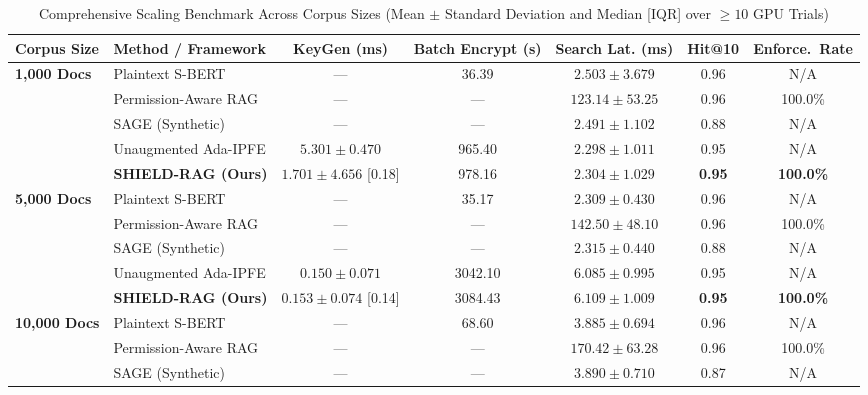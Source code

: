 \documentclass[10pt,a4paper]{article}
\begin{document}
\begin{table}[t]
\centering
\caption{Comprehensive Scaling Benchmark Across Corpus Sizes (Mean $\pm$ Standard Deviation and Median [IQR] over $\ge 10$ GPU Trials)}
\label{tab:scaling_evaluation}
\renewcommand{\arraystretch}{1.2}
\footnotesize
\setlength{\tabcolsep}{3.5pt}
\begin{tabular}{@{}llccccc@{}}
\toprule
\textbf{Corpus Size} & \textbf{Method / Framework} & \textbf{KeyGen (ms)} & \textbf{Batch Encrypt (s)} & \textbf{Search Lat. (ms)} & \textbf{Hit@10} & \textbf{Enforce.\ Rate} \\ \midrule
\multirow{5}{*}{\textbf{1,000 Docs}}
 & Plaintext S-BERT \cite{lewis2020rag} & --- & 36.39 & $2.503 \pm 3.679$ & 0.96 & N/A \\
 & Permission-Aware RAG \cite{jeong2025permissionaware} & --- & --- & $123.14 \pm 53.25$ & 0.96 & 100.0\% \\
 & SAGE (Synthetic) \cite{zeng2025mitigating} & --- & --- & $2.491 \pm 1.102$ & 0.88 & N/A \\
 & Unaugmented Ada-IPFE \cite{zhou2026cipherag} & $5.301 \pm 0.470$ & 965.40 & $2.298 \pm 1.011$ & 0.95 & N/A \\
 & \textbf{SHIELD-RAG (Ours)} & $1.701 \pm 4.656$ [0.18] & 978.16 & $\mathbf{2.304 \pm 1.029}$ & \textbf{0.95} & \textbf{100.0\%} \\ \midrule
\multirow{5}{*}{\textbf{5,000 Docs}}
 & Plaintext S-BERT \cite{lewis2020rag} & --- & 35.17 & $2.309 \pm 0.430$ & 0.96 & N/A \\
 & Permission-Aware RAG \cite{jeong2025permissionaware} & --- & --- & $142.50 \pm 48.10$ & 0.96 & 100.0\% \\
 & SAGE (Synthetic) \cite{zeng2025mitigating} & --- & --- & $2.315 \pm 0.440$ & 0.88 & N/A \\
 & Unaugmented Ada-IPFE \cite{zhou2026cipherag} & $0.150 \pm 0.071$ & 3042.10 & $6.085 \pm 0.995$ & 0.95 & N/A \\
 & \textbf{SHIELD-RAG (Ours)} & $0.153 \pm 0.074$ [0.14] & 3084.43 & $\mathbf{6.109 \pm 1.009}$ & \textbf{0.95} & \textbf{100.0\%} \\ \midrule
\multirow{5}{*}{\textbf{10,000 Docs}}
 & Plaintext S-BERT \cite{lewis2020rag} & --- & 68.60 & $3.885 \pm 0.694$ & 0.96 & N/A \\
 & Permission-Aware RAG \cite{jeong2025permissionaware} & --- & --- & $170.42 \pm 63.28$ & 0.96 & 100.0\% \\
 & SAGE (Synthetic) \cite{zeng2025mitigating} & --- & --- & $3.890 \pm 0.710$ & 0.87 & N/A \\

\end{tabular}
\end{table}
\end{document}
